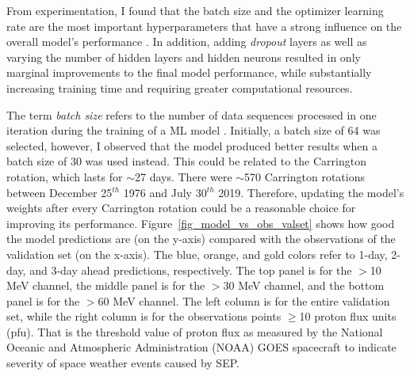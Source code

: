 From experimentation, I found that the batch size and the optimizer learning rate are the most important hyperparameters that have a strong influence on the overall model's performance \citep{greff_2016}.
In addition, adding \textit{dropout} layers as well as varying the number of hidden layers and hidden neurons resulted in only marginal improvements to the final model performance, while substantially increasing training time and requiring greater computational resources.

The term \textit{batch size} refers to the number of data sequences processed in one iteration during the training of a ML model \citep{goodfellow_2016}. Initially, a batch size of 64 was selected, however, I observed that the model produced better results when a batch size of 30 was used instead. This could be related to the Carrington rotation, which lasts for $\sim$27 days. There were $\sim$570 Carrington rotations between December 25$^{th}$ 1976 and July 30$^{th}$ 2019. Therefore, updating the model's weights after every Carrington rotation could be a reasonable choice for improving its performance.
Figure~\ref{fig_model_vs_obs_valset} shows how good the model predictions are (on the y-axis) compared with the observations of the validation set (on the x-axis). The blue, orange, and gold colors refer to 1-day, 2-day, and 3-day ahead predictions, respectively. The top panel is for the $>$10 MeV channel, the middle panel is for the $>$30 MeV channel, and the bottom panel is for the $>$60 MeV channel. The left column is for the entire validation set, while the right column is for the observations points $\geq$10 proton flux units (pfu). That is the threshold value of proton flux as measured by the National Oceanic and Atmospheric Administration (NOAA) GOES spacecraft to indicate severity of space weather events caused by SEP.

